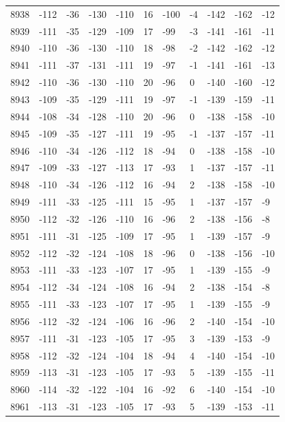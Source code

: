 \begin{table}[H]
\begin{tabular}{lllllllllll}
8938 & -112 & -36 & -130 & -110 & 16 & -100 & -4 & -142 & -162 & -12 \\
8939 & -111 & -35 & -129 & -109 & 17 & -99 & -3 & -141 & -161 & -11 \\
8940 & -110 & -36 & -130 & -110 & 18 & -98 & -2 & -142 & -162 & -12 \\
8941 & -111 & -37 & -131 & -111 & 19 & -97 & -1 & -141 & -161 & -13 \\
8942 & -110 & -36 & -130 & -110 & 20 & -96 & 0 & -140 & -160 & -12 \\
8943 & -109 & -35 & -129 & -111 & 19 & -97 & -1 & -139 & -159 & -11 \\
8944 & -108 & -34 & -128 & -110 & 20 & -96 & 0 & -138 & -158 & -10 \\
8945 & -109 & -35 & -127 & -111 & 19 & -95 & -1 & -137 & -157 & -11 \\
8946 & -110 & -34 & -126 & -112 & 18 & -94 & 0 & -138 & -158 & -10 \\
8947 & -109 & -33 & -127 & -113 & 17 & -93 & 1 & -137 & -157 & -11 \\
8948 & -110 & -34 & -126 & -112 & 16 & -94 & 2 & -138 & -158 & -10 \\
8949 & -111 & -33 & -125 & -111 & 15 & -95 & 1 & -137 & -157 & -9 \\
8950 & -112 & -32 & -126 & -110 & 16 & -96 & 2 & -138 & -156 & -8 \\
8951 & -111 & -31 & -125 & -109 & 17 & -95 & 1 & -139 & -157 & -9 \\
8952 & -112 & -32 & -124 & -108 & 18 & -96 & 0 & -138 & -156 & -10 \\
8953 & -111 & -33 & -123 & -107 & 17 & -95 & 1 & -139 & -155 & -9 \\
8954 & -112 & -34 & -124 & -108 & 16 & -94 & 2 & -138 & -154 & -8 \\
8955 & -111 & -33 & -123 & -107 & 17 & -95 & 1 & -139 & -155 & -9 \\
8956 & -112 & -32 & -124 & -106 & 16 & -96 & 2 & -140 & -154 & -10 \\
8957 & -111 & -31 & -123 & -105 & 17 & -95 & 3 & -139 & -153 & -9 \\
8958 & -112 & -32 & -124 & -104 & 18 & -94 & 4 & -140 & -154 & -10 \\
8959 & -113 & -31 & -123 & -105 & 17 & -93 & 5 & -139 & -155 & -11 \\
8960 & -114 & -32 & -122 & -104 & 16 & -92 & 6 & -140 & -154 & -10 \\
8961 & -113 & -31 & -123 & -105 & 17 & -93 & 5 & -139 & -153 & -11 \\

\end{tabular}
\end{table}
